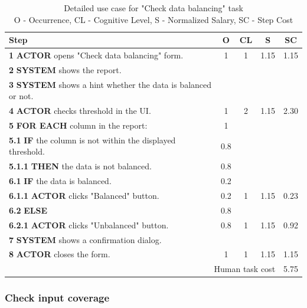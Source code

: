 \begin{table}[H]
\centering
\begin{tabularx}{\textwidth}{|X|c|c|c|c|}
\hline
\textbf{Step} & \textbf{O} & \textbf{CL} & \textbf{S} & \textbf{SC} \\
\hline
\textbf{1} \textbf{ACTOR} opens "Check data balancing" form. & 1 & 1 & 1.15 & 1.15 \\
\hline
\textbf{2} \textbf{SYSTEM} shows the report. & & & & \\
\hline
\textbf{3} \textbf{SYSTEM} shows a hint whether the data is balanced or not. & & & & \\
\hline
\textbf{4} \textbf{ACTOR} checks threshold in the UI. & 1 & 2 & 1.15 & 2.30 \\
\hline
\textbf{5} \textbf{FOR EACH} column in the report: & 1 & & & \\
\hline
\textbf{5.1} \textbf{IF} the column is not within the displayed threshold. & 0.8 & & & \\
\hline
\textbf{5.1.1} \textbf{THEN} the data is not balanced. & 0.8 & & & \\
\hline
\textbf{6.1} \textbf{IF} the data is balanced. & 0.2 & & & \\
\hline
\textbf{6.1.1} \textbf{ACTOR} clicks "Balanced" button. & 0.2 & 1 & 1.15 & 0.23 \\
\hline
\textbf{6.2} \textbf{ELSE} & 0.8 & & & \\
\hline
\textbf{6.2.1} \textbf{ACTOR} clicks "Unbalanced" button. & 0.8 & 1 & 1.15 & 0.92 \\
\hline
\textbf{7} \textbf{SYSTEM} shows a confirmation dialog. & & & & \\
\hline
\textbf{8} \textbf{ACTOR} closes the form. & 1 & 1 & 1.15 & 1.15 \\
\hline
\multicolumn{4}{|r|}{Human task cost} & 5.75 \\
\hline
\end{tabularx}
\caption{Detailed use case for "Check data balancing" task\\ 
 O - Occurrence, CL - Cognitive Level, S - Normalized Salary, SC - Step Cost}
\label{table:check_data_balancing}
\end{table}

\subsubsection{Check input coverage}

